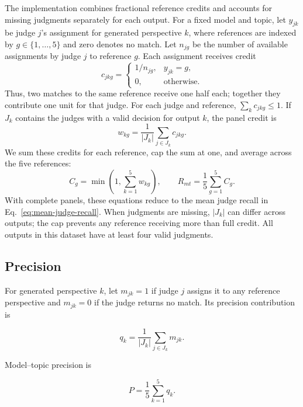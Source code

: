\documentclass[11pt,a4paper]{article}
\begin{document}
The implementation combines fractional reference credits and accounts for missing judgments separately for each output. For a fixed model and topic, let $y_{jk}$ be judge $j$'s assignment for generated perspective $k$, where references are indexed by $g\in\{1,\ldots,5\}$ and zero denotes no match. Let $n_{jg}$ be the number of available assignments by judge $j$ to reference $g$. Each assignment receives credit
\begin{equation}
c_{jkg}=\begin{cases}
1/n_{jg}, & y_{jk}=g,\\
0, & \text{otherwise}.
\end{cases}
\label{eq:split-credit}
\end{equation}
Thus, two matches to the same reference receive one half each; together they contribute one unit for that judge. For each judge and reference, $\sum_k c_{jkg}\leq 1$. If $J_k$ contains the judges with a valid decision for output $k$, the panel credit is
\begin{equation}
w_{kg}=\frac{1}{|J_k|}\sum_{j\in J_k}c_{jkg}.
\label{eq:panel-credit}
\end{equation}
We sum these credits for each reference, cap the sum at one, and average across the five references:
\begin{equation}
C_g=\min\!\left(1,\sum_{k=1}^{5}w_{kg}\right),
\qquad
R_{mt}=\frac{1}{5}\sum_{g=1}^{5}C_g.
\label{eq:topic-recall}
\end{equation}
With complete panels, these equations reduce to the mean judge recall in Eq.~\ref{eq:mean-judge-recall}. When judgments are missing, $|J_k|$ can differ across outputs; the cap prevents any reference receiving more than full credit. All outputs in this dataset have at least four valid judgments.


\subsection{Precision}
\label{app:precision_aggregation}

For generated perspective $k$, let $m_{jk}=1$ if judge $j$ assigns it to any reference perspective and $m_{jk}=0$ if the judge returns no match. Its precision contribution is

\begin{equation}
 q_k=\frac{1}{|J_k|}\sum_{j\in J_k}m_{jk}.
\end{equation}

Model--topic precision is

\begin{equation}
 P=\frac{1}{5}\sum_{k=1}^{5}q_k.
\end{equation}
\end{document}

